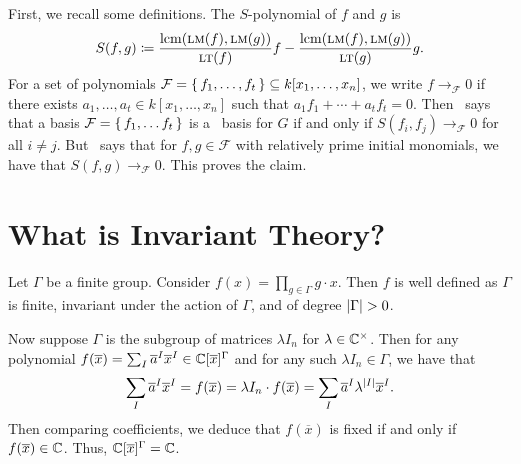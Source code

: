 \documentclass[letterpaper, 11pt, oneside]{book}
\begin{document}
\begin{sol}
  First, we recall some definitions.
  The $S$-polynomial of $f$ and $g$ is
  \[
    S(f, g) \coloneqq \frac{\operatorname{lcm}(\operatorname{\textsc{lm}}(f), \operatorname{\textsc{lm}}(g))}{\operatorname{\textsc{lt}}(f)} f - \frac{\operatorname{lcm}(\operatorname{\textsc{lm}}(f), \operatorname{\textsc{lm}}(g))}{\operatorname{\textsc{lt}}(g)} g.
  \]
  For a set of polynomials $\mathcal{F} = \set{f_{1}, \ldots, f_{t}} \subseteq k[x_{1}, \ldots, x_{n}]$, we write $f \to_{\mathcal{F}} 0$ if there exists $a_{1}, \ldots, a_{t} \in k[x_{1}, \ldots, x_{n}]$ such that $a_{1} f_{1} + \cdots + a_{t} f_{t} = 0$.
  Then~\cite[Chapter 2, \S 9, Theorem 3]{book:IVA} says that a basis $\mathcal{F} = \set{f_{1}, \ldots f_{t}}$ is a \Grobner\ basis for $G$ if and only if $S(f_{i}, f_{j}) \to_{\mathcal{F}} 0$ for all $i \neq j$.
  But~\cite[Chapter 2, \S 9, Proposition 4]{book:IVA} says that for $f, g \in \mathcal{F}$ with relatively prime initial monomials, we have that $S(f, g) \to_{\mathcal{F}} 0$.
  This proves the claim.
\end{sol}

\clearpage

\section{What is Invariant Theory?}

\begin{sol}
  Let $\Gamma$ be a finite group.
  Consider $f(x) = \prod_{g \in \Gamma} g \cdot x$.
  Then $f$ is well defined as $\Gamma$ is finite, invariant under the action of $\Gamma$, and of degree $\abs{\Gamma} > 0$.

  Now suppose $\Gamma$ is the subgroup of matrices $\lambda I_{n}$ for $\lambda \in \mathbb{C}^{\times}$.
  Then for any polynomial $f(\overline{x}) = \sum_{I} \overline{a}^{I} \overline{x}^{I} \in \mathbb{C}[\overline{x}]^{\Gamma}$ and for any such $\lambda I_{n} \in \Gamma$, we have that
  \[
    \sum_{I} \overline{a}^{I} \overline{x}^{I} = f(\overline{x}) = \lambda I_{n} \cdot f(\overline{x}) = \sum_{I} \overline{a}^{I} \lambda^{\abs{I}} \overline{x}^{I}.
  \]
  Then comparing coefficients, we deduce that $f(\overline{x})$ is fixed if and only if $f(\overline{x}) \in \mathbb{C}$.
  Thus, $\mathbb{C}[\overline{x}]^{\Gamma} = \mathbb{C}$.
\end{sol}


\printbibliography
\end{document}
